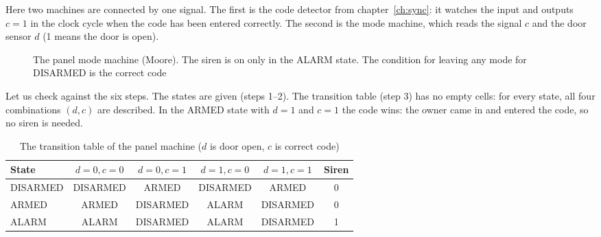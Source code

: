 Here two machines are connected by one signal. The first is the code detector
from chapter~\ref{ch:sync}: it watches the input and outputs $c=1$ in the
clock cycle when the code has been entered correctly. The second is the mode
machine, which reads the signal $c$ and the door sensor $d$ (1 means the door
is open).

\begin{figure}[H]
\centering
{}
\caption{The panel mode machine (Moore). The siren is on only in the ALARM
state. The condition for leaving any mode for DISARMED is the correct code}
\label{fig:panel_fsm}
\end{figure}

Let us check against the six steps. The states are given (steps 1--2). The
transition table (step 3) has no empty cells: for every state, all four
combinations $(d,c)$ are described. In the ARMED state with $d=1$ and $c=1$ the
code wins: the owner came in and entered the code, so no siren is needed.

\begin{table}[H]
\centering
\caption{The transition table of the panel machine ($d$ is door open, $c$ is correct code)}
\small
\begin{tabular}{l|cccc|c}
\toprule
\textbf{State} & $d{=}0,c{=}0$ & $d{=}0,c{=}1$ & $d{=}1,c{=}0$ & $d{=}1,c{=}1$ & \textbf{Siren} \\
\midrule
DISARMED & DISARMED & ARMED & DISARMED & ARMED & 0 \\
ARMED    & ARMED & DISARMED & ALARM & DISARMED & 0 \\
ALARM    & ALARM & DISARMED & ALARM & DISARMED & 1 \\
\bottomrule
\end{tabular}
\end{table}

